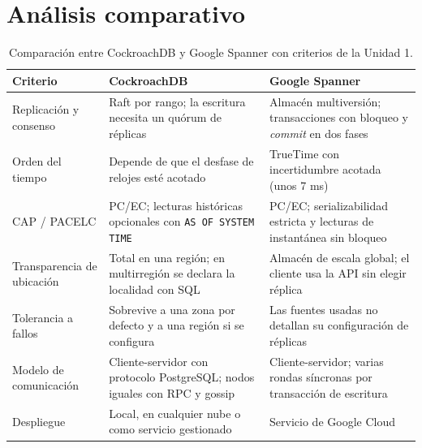 \documentclass[12pt,a4paper]{article}
\begin{document}
\section{Análisis comparativo}

\begin{table}[H]
  \centering
  \small
  \caption{Comparación entre CockroachDB y Google Spanner con criterios de la Unidad 1.}
  \label{tab:comparacion}
  \begin{tabular}{>{\raggedright\arraybackslash}p{3.3cm}>{\raggedright\arraybackslash}p{5.6cm}>{\raggedright\arraybackslash}p{5.6cm}}
    \toprule
    \textbf{Criterio} & \textbf{CockroachDB} & \textbf{Google Spanner} \\
    \midrule
    Replicación y consenso & Raft por rango; la escritura necesita un quórum de réplicas \cite{pina2023newsql, ajmani2022demo} & Almacén multiversión; transacciones con bloqueo y \emph{commit} en dos fases \cite{song2025k2} \\
    \addlinespace
    Orden del tiempo & Depende de que el desfase de relojes esté acotado \cite{ajmani2022demo} & TrueTime con incertidumbre acotada (unos 7 ms) \cite{song2025k2} \\
    \addlinespace
    CAP / PACELC & PC/EC; lecturas históricas opcionales con \texttt{AS OF SYSTEM TIME} \cite{ajmani2022demo} & PC/EC; serializabilidad estricta y lecturas de instantánea sin bloqueo \cite{song2025k2} \\
    \addlinespace
    Transparencia de ubicación & Total en una región; en multirregión se declara la localidad con SQL \cite{vanbenschoten2022multiregion} & Almacén de escala global; el cliente usa la API sin elegir réplica \cite{song2025k2} \\
    \addlinespace
    Tolerancia a fallos & Sobrevive a una zona por defecto y a una región si se configura \cite{ajmani2022demo} & Las fuentes usadas no detallan su configuración de réplicas \\
    \addlinespace
    Modelo de comunicación & Cliente-servidor con protocolo PostgreSQL; nodos iguales con RPC y gossip & Cliente-servidor; varias rondas síncronas por transacción de escritura \cite{song2025k2} \\
    \addlinespace
    Despliegue & Local, en cualquier nube o como servicio gestionado \cite{swenson2025serverless} & Servicio de Google Cloud \\
    \bottomrule
  \end{tabular}
\end{table}
\end{document}
